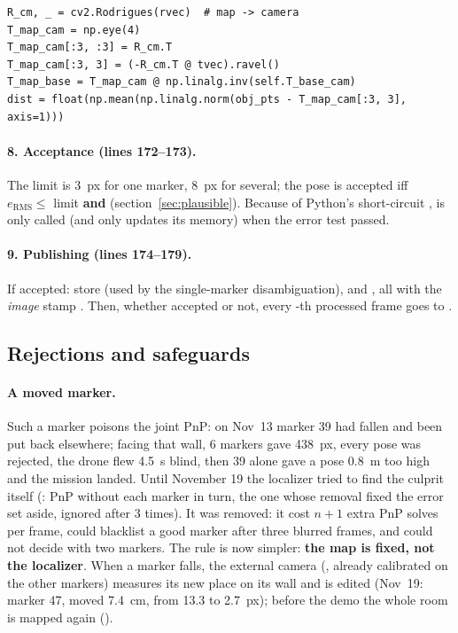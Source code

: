 \begin{lstlisting}
R_cm, _ = cv2.Rodrigues(rvec)  # map -> camera
T_map_cam = np.eye(4)
T_map_cam[:3, :3] = R_cm.T
T_map_cam[:3, 3] = (-R_cm.T @ tvec).ravel()
T_map_base = T_map_cam @ np.linalg.inv(self.T_base_cam)
dist = float(np.mean(np.linalg.norm(obj_pts - T_map_cam[:3, 3], axis=1)))
\end{lstlisting}

\paragraph{8. Acceptance (lines 172--173).} The limit is 3~px for one marker, 8~px for several; the pose is accepted
iff $e_{\text{RMS}}\leq$ limit \textbf{and}  (section~\ref{sec:plausible}). Because of
Python's short-circuit ,  is only called (and only updates its memory) when the error test
passed.

\paragraph{9. Publishing (lines 174--179).} If accepted: store  (used by the
single-marker disambiguation),  and , all with the \emph{image} stamp
. Then, whether accepted or not, every -th processed frame goes to
.

\subsection{Rejections and safeguards}

\paragraph{A moved marker.}\label{sec:moved}
Such a marker poisons the joint PnP: on Nov~13 marker 39 had fallen and been put back elsewhere; facing that wall,
6 markers gave 438~px, every pose was rejected, the drone flew 4.5~s blind, then 39 alone gave a pose 0.8~m too high
and the mission landed. Until November 19 the localizer tried to find the culprit itself (:
PnP without each marker in turn, the one whose removal fixed the error set aside, ignored after 3 times). It was
removed: it cost $n+1$ extra PnP solves per frame, could blacklist a good marker after three blurred frames, and could
not decide with two markers. The rule is now simpler: \textbf{the map is fixed, not the localizer}. When a marker
falls, the external camera (, already calibrated on the other markers) measures its new
place on its wall and  is edited (Nov~19: marker 47, moved 7.4~cm, from 13.3 to 2.7~px);
before the demo the whole room is mapped again ().

